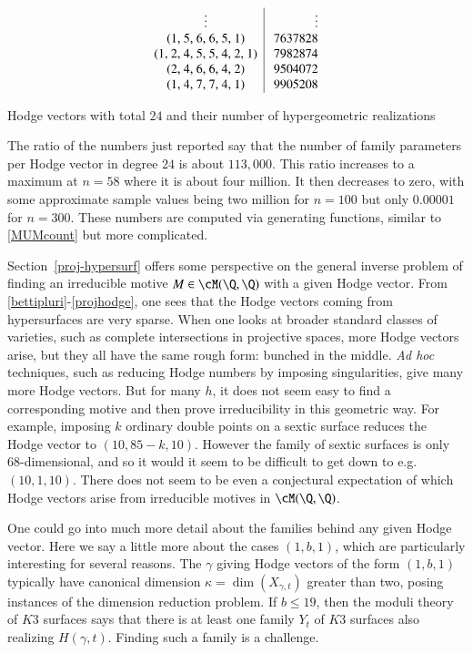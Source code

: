 \documentclass{notices}
\numberwithin{equation}{section}
\numberwithin{table}{section}
\numberwithin{figure}{section}
\begin{document}
{\begin{table}[htb]
\[\begin{array}{c|r}
$\vdots$&$\vdots$\\
$(1, 5, 6, 6, 5, 1)$&$	              7637828$\\
$(1, 2, 4, 5, 5, 4, 2, 1)$&$	      7982874$\\
$(2, 4, 6, 6, 4, 2)$&$	              9504072$\\
$(1, 4, 7, 7, 4, 1)$&$	              9905208$
\end{array}
\]
\caption{\label{rank24} Hodge vectors with total $24$ and
their number of hypergeometric realizations}
\end{table}

The ratio of the numbers just reported say 
that the number of family parameters per Hodge
vector in degree $24$ is about $113,000$.  
This ratio increases to a maximum at
$n=58$ where it is about four million.   
It then decreases to zero, with some 
approximate sample values being
two million for $n=100$ but only 
$0.00001$ for $n=300$.   These 
numbers are computed via generating 
functions, similar to \eqref{MUMcount}
but more complicated.

 Section~\ref{proj-hypersurf} offers some perspective on the 
 general inverse problem of finding an irreducible 
 motive $M \in \cM(\Q,\Q)$ with a given Hodge
 vector.  
 From \eqref{bettipluri}-\eqref{projhodge}, one sees that the 
 Hodge vectors coming from hypersurfaces are very sparse.
 When one looks at broader standard classes of varieties,
 such as complete intersections in projective spaces,
 more Hodge vectors arise, but they all have the same 
 rough form: bunched in the middle.  {\em Ad hoc} 
 techniques, such as reducing Hodge numbers
 by imposing singularities, give many more Hodge vectors. 
 But for many $h$, it does not seem easy to find
 a corresponding motive and then prove irreducibility in this geometric way. 
  For example, imposing $k$ ordinary double 
 points on a sextic surface reduces the
 Hodge vector to $(10,85-k,10)$.  However
 the family of sextic surfaces is only $68$-dimensional,
 and so it would it seem to be difficult to get down to 
 e.g.\ $(10,1,10)$.  There does not seem
 to be even a conjectural expectation of 
 which Hodge vectors arise
 from irreducible motives in 
 $\cM(\Q,\Q)$.
 

One could go into much more detail about 
the families behind any given Hodge vector. 
Here we say a little more about the
cases $(1,b,1)$, which 
are particularly interesting for
several reasons.  The $\gamma$ giving Hodge vectors
of the form $(1,b,1)$  typically have canonical dimension 
$\kappa = \dim(X_{\gamma,t})$ greater than 
two, posing instances of the dimension reduction problem.  
If $b \leq 19$, then the moduli theory
of $K3$ surfaces says that there is at least one
family $Y_{t}$ of $K3$ surfaces
also realizing $H(\gamma,t)$.  Finding
such a family is a challenge.

}
\end{document}
